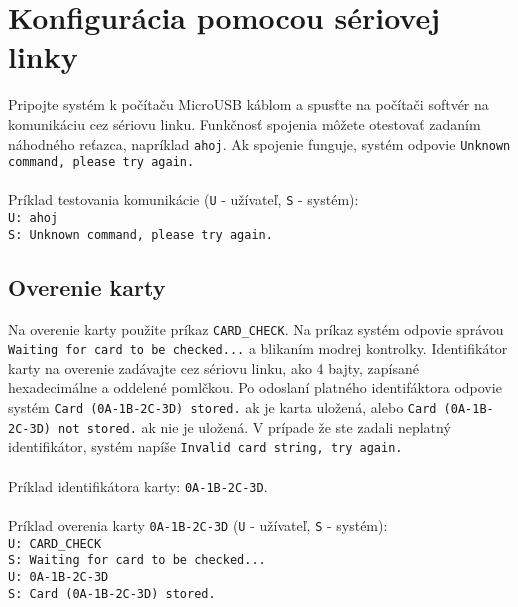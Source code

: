 \documentclass[a4paper]{article}
\begin{document}
\section{Konfigurácia pomocou sériovej linky}
Pripojte systém k počítaču MicroUSB káblom a spusťte na počítači softvér na komunikáciu cez sériovu linku. Funkčnosť spojenia môžete otestovať zadaním náhodného reťazca, napríklad \texttt{ahoj}. Ak spojenie funguje, systém odpovie \texttt{Unknown command, please try again.}
\\\\
Príklad testovania komunikácie (\texttt{U} - užívateľ, \texttt{S} - systém):\\
\texttt{U: ahoj}\\
\texttt{S: Unknown command, please try again.}\\

\subsection{Overenie karty}
Na overenie karty použite príkaz \texttt{CARD\_CHECK}. Na príkaz systém odpovie správou \texttt{Waiting for card to be checked...} a blikaním modrej kontrolky. Identifikátor karty na overenie zadávajte cez sériovu linku, ako 4 bajty, zapísané hexadecimálne a oddelené pomlčkou. Po odoslaní platného identifáktora odpovie systém \texttt{Card (0A-1B-2C-3D) stored.} ak je karta uložená, alebo \texttt{Card (0A-1B-2C-3D) not stored.} ak nie je uložená. V prípade že ste zadali neplatný identifikátor, systém napíše \texttt{Invalid card string, try again.}
\\\\
Príklad identifikátora karty: \texttt{0A-1B-2C-3D}.
\\\\
Príklad overenia karty \texttt{0A-1B-2C-3D} (\texttt{U} - užívateľ, \texttt{S} - systém):\\
\texttt{U: CARD\_CHECK}\\
\texttt{S: Waiting for card to be checked...}\\
\texttt{U: 0A-1B-2C-3D}\\
\texttt{S: Card (0A-1B-2C-3D) stored.}\\
\end{document}
